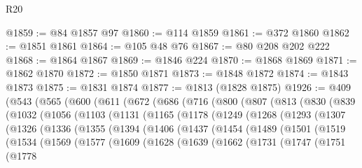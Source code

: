\begin{lexlean}{R20}
\begin{coremodule}
@1859 := @84 @1857 @97
@1860 := @114 @1859
@1861 := @372 @1860
@1862 := @1851 @1861
@1864 := @105 @48 @76
@1867 := @80 @208 @202 @222
@1868 := @1864 @1867
@1869 := @1846 @224
@1870 := @1868 @1869
@1871 := @1862 @1870
@1872 := @1850 @1871
@1873 := @1848 @1872
@1874 := @1843 @1873
@1875 := @1831 @1874
@1877 := @1813 (@1828 @1875)
@1926 := @409
    (@543
      (@565
        (@600
          (@611
            (@672
              (@686
                (@716
                  (@800
                    (@807
                      (@813
                        (@830
                          (@839
                            (@1032
                              (@1056
                                (@1103
                                  (@1131
                                    (@1165
                                      (@1178
                                        (@1249
                                          (@1268
                                            (@1293
                                              (@1307
                                                (@1326
                                                  (@1336
                                                    (@1355
                                                      (@1394
                                                        (@1406
                                                          (@1437
                                                            (@1454
                                                              (@1489
                                                                (@1501
                                                                  (@1519
                                                                    (@1534
                                                                      (@1569
                                                                        (@1577
                                                                          (@1609
                                                                            (@1628
                                                                              (@1639
                                                                                (@1662
                                                                                  (@1731
                                                                                    (@1747
                                                                                      (@1751
                                                                                        (@1778

\end{coremodule}
\end{lexlean}
